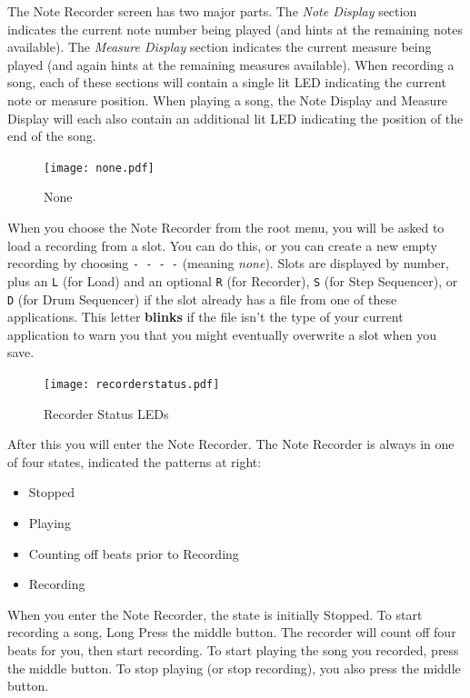 \documentclass{article}
\begin{document}
The Note Recorder screen has two major parts.  The {\it Note Display} section indicates the current note number being played (and hints at the remaining notes available).  The {\it Measure Display} section indicates the current measure being played (and again hints at the remaining measures available).  When recording a song, each of these sections will contain a single lit LED indicating the current note or measure position.  When playing a song, the Note Display and Measure Display will each also contain an additional lit LED indicating the position of the end of the song.

\begin{figure}
\texttt{[image: none.pdf]}
\vspace{-2em}\caption{\small None}\vspace{-1em}
\label{none}
\end{figure}

When you choose the Note Recorder from the root menu, you will be asked to load a recording from a slot.  You can do this, or you can create a new empty recording by choosing \texttt{-~-~-~-} (meaning {\it none}).  Slots are displayed by number, plus an \texttt{L} (for Load) and an optional \texttt{R} (for Recorder), \texttt{S} (for Step Sequencer), or \texttt{D} (for Drum Sequencer) if the slot already has a file from one of these applications.  This letter {\bf blinks} if the file isn't the type of your current application to warn you that you might eventually overwrite a slot when you save.

\begin{figure}
\texttt{[image: recorderstatus.pdf]}
\vspace{-2em}\caption{\small Recorder Status LEDs}\vspace{-4em}
\label{recorderstatus}
\end{figure}

After this you will enter the Note Recorder.  The Note Recorder is always in one of four states, indicated the patterns at right:

\begin{itemize}
\item Stopped
\item Playing
\item Counting off beats prior to Recording
\item Recording
\end{itemize}

When you enter the Note Recorder, the state is initially Stopped.  To start recording a song, Long Press the middle button.  The recorder will count off four beats for you, then start recording.  To start playing the song you recorded, press the middle button.  To stop playing (or stop recording), you also press the middle button.
\end{document}
